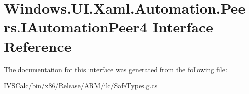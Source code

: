\hypertarget{interface_windows_1_1_u_i_1_1_xaml_1_1_automation_1_1_peers_1_1_i_automation_peer4}{}\section{Windows.\+U\+I.\+Xaml.\+Automation.\+Peers.\+I\+Automation\+Peer4 Interface Reference}
\label{interface_windows_1_1_u_i_1_1_xaml_1_1_automation_1_1_peers_1_1_i_automation_peer4}


The documentation for this interface was generated from the following file\+:\begin{DoxyCompactItemize}
\item 
I\+V\+S\+Calc/bin/x86/\+Release/\+A\+R\+M/ilc/Safe\+Types.\+g.\+cs\end{DoxyCompactItemize}
